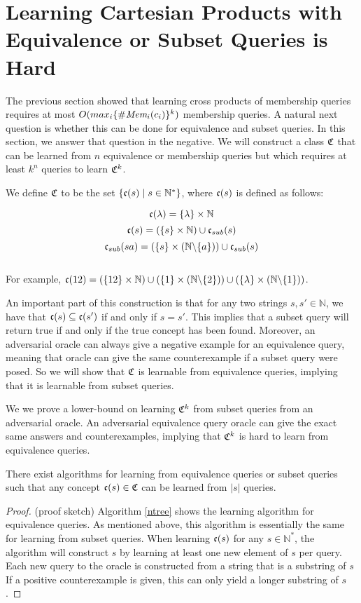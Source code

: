 \documentclass[11pt]{amsart}
\begin{document}
\section{Learning Cartesian Products with Equivalence or Subset Queries is Hard}


The previous section showed that learning cross products of membership queries requires at most $O(max_i \{ \#\emph{Mem}_{i}(c_i) \}^k)$ membership queries. 
A natural next question is whether this can be done for equivalence and subset queries. 
In this section, we answer that question in the negative. 
We will construct a class $\mathfrak{C}$ that can be learned from $n$ equivalence or membership queries but which requires at least $k^n$ queries to learn $\mathfrak{C}^k$.  

We define $\mathfrak{C}$ to be the set $\{ \mathfrak{c}(s) \mid s \in \mathbb{N}^* \}$, where $\mathfrak{c}(s)$ is defined as follows:

\[\mathfrak{c}(\lambda) = \{\lambda\} \times \mathbb{N}\]
\[\mathfrak{c}(s) = (\{s\} \times \mathbb{N}) \cup \mathfrak{c}_{sub}(s)\]
\[\mathfrak{c}_{sub}(sa) = (\{s\} \times (\mathbb{N} \backslash \{a\})) \cup \mathfrak{c}_{sub}(s)\]\\

For example, $\mathfrak{c}(12) = (\{12\} \times \mathbb{N}) \cup (\{1\}\times(\mathbb{N} \backslash \{2\}))\cup(\{\lambda\} \times (\mathbb{N} \backslash \{1\}))$.


An important part of this construction is that for any two strings $s,s' \in \mathbb{N}$, we have that $\mathfrak{c}(s) \subseteq \mathfrak{c}(s')$ if and only if $s = s'$. 
This implies that a subset query will return true if and only if the true concept has been found. 
Moreover, an adversarial oracle can always give a negative example for an equivalence query, meaning that oracle can give the same counterexample if a subset query were posed. 
So we will show that $\mathfrak{C}$ is learnable from equivalence queries, implying that it is learnable from subset queries. 

We we prove a lower-bound on learning $\mathfrak{C}^k$ from subset queries from an adversarial oracle. 
An adversarial equivalence query oracle can give the exact same answers and counterexamples, implying that  $\mathfrak{C}^k$ is hard to learn from equivalence queries. 

\begin{proposition}
There exist algorithms for learning from equivalence queries or subset queries such that any concept $\mathfrak{c}(s) \in \mathfrak{C}$ can be learned from $|s|$ queries. 
\end{proposition}
\begin{proof}
(proof sketch) Algorithm \ref{ntree} shows the learning algorithm for equivalence queries. 
As mentioned above, this algorithm is essentially the same for learning from subset queries. 
When learning $\mathfrak{c}(s)$ for any $s \in \mathbb{N}^*$, the algorithm will construct $s$ by learning at least one new element of $s$ per query. 
Each new query to the oracle is constructed from a string that is a substring of $s$
If a positive counterexample is given, this can only yield a longer substring of $s$.
\end{proof}
\end{document}
